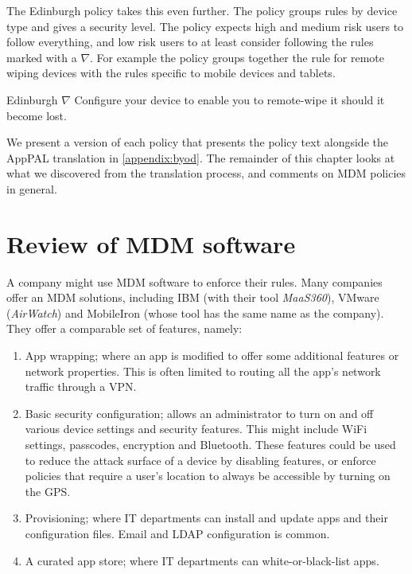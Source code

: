 \documentclass[thesis.tex]{subfiles}
\begin{document}
The Edinburgh policy takes this even further. The policy groups rules by device type
and gives a security level.  The policy expects high and medium risk users
to follow everything, and low risk users to at least
consider following the rules marked with a $\nabla$.  For example the policy groups together the
rule for remote wiping devices with the rules specific to mobile
devices and tablets. 

\begin{policyrule}{Edinburgh}
  $\nabla$ Configure your device to enable you to remote-wipe it should it become lost.
\end{policyrule}

We present a version of each policy that presents the policy text
alongside the AppPAL translation in \autoref{appendix:byod}.  The
remainder of this chapter looks at what we discovered from the
translation process, and comments on \ac{MDM} policies in general.

\section{Review of MDM software}

A company might use \ac{MDM} software to enforce their rules.  Many
companies offer an \ac{MDM} solutions, including IBM (with their tool
\emph{MaaS360}), VMware (\emph{AirWatch}) and MobileIron (whose tool
has the same name as the company). They offer a comparable set of
features, namely:
\begin{enumerate}
\item App wrapping; where an app is modified to offer some additional
  features or network properties. This is often limited to routing all
  the app's network traffic through a VPN.
\item Basic security configuration; allows an administrator to turn on
  and off various device settings and security features. This might
  include WiFi settings, passcodes, encryption and Bluetooth.  These
  features could be used to reduce the attack surface of a device by
  disabling features, or enforce policies that require a user's location
  to always be accessible by turning on the GPS.
\item Provisioning; where IT departments can install and update apps and
  their configuration files. Email and LDAP configuration is common.
\item A curated app store; where IT departments can white-or-black-list apps.
\end{enumerate}
\end{document}

